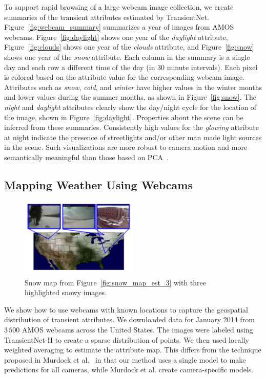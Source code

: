 \documentclass[10pt,twocolumn,letterpaper]{article}
\newcommand{\figref}[1]{Figure~\ref{fig:#1}}
\begin{document}
To support rapid browsing of a large webcam image collection, we create
summaries of the transient attributes estimated by TransientNet.
\figref{webcam_summary} summarizes a year of images from AMOS webcams.
\figref{daylight} shows one year of the \emph{daylight} attribute,
\figref{clouds} shows one year of the \emph{clouds} attribute, and
\figref{snow} shows one year of the \emph{snow} attribute.  Each column in the
summary is a single day and each row a different time of the day (in 30 minute
intervals).  Each pixel is colored based on the attribute value for the
corresponding webcam image. Attributes such as \textit{snow}, \textit{cold},
and \textit{winter} have higher values in the winter months and lower values
during the summer months, as shown in \figref{snow}. The \textit{night} and
\textit{daylight} attributes clearly show the day/night cycle for the location
of the image, shown in \figref{daylight}.  Properties about the scene can be
inferred from these summaries.  Consistently high values for the
\textit{glowing} attribute at night indicate the presence of streetlights
and/or other man made light sources in the scene.  Such visualizations are more
robust to camera motion and more semantically meaningful than those based on
PCA~\cite{jacobs09webcamdata}.

\subsection{Mapping Weather Using Webcams}

\begin{figure}[t]
	\centering
		\includegraphics[width=0.5\textwidth, trim= 0mm 10mm 0mm 0mm]{figs/snow_exs.pdf}
		\caption{Snow map from \figref{snow_map_est_3} with three highlighted snowy 
             images.}
		\label{fig:snow_exs}
\end{figure}

We show how to use webcams with known locations to capture the geospatial
distribution of transient attributes. We downloaded data for January 2014 from
$3\,500$ AMOS webcams across the United States.  The images were labeled using
TransientNet-H to create a sparse distribution of points.  We then used locally
weighted averaging to estimate the attribute map.  This differs from the
technique proposed in Murdock et al.~\cite{murdock13clouds} in that our method
uses a single model to make predictions for all cameras, while Murdock et al.
create camera-specific models.
\end{document}
